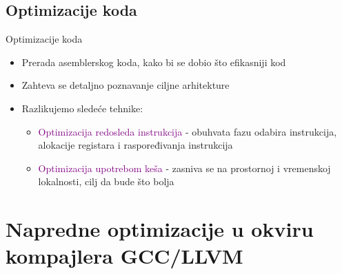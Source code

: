 \documentclass[compress, containsverbatim,mathserif, xcolor=dvipsnames, unicode]{beamer}
\begin{document}
\subsection{Optimizacije koda}
\begin{frame}{Optimizacije koda}
    
    \begin{itemize}
        \item Prerada asemblerskog koda, kako bi se dobio što efikasniji kod
        \item Zahteva se detaljno poznavanje ciljne arhitekture 
        \item Razlikujemo  sledeće tehnike: 
                \begin{itemize}
                    \item \textcolor{purple}{Optimizacija redosleda instrukcija }- obuhvata fazu odabira instrukcija, alokacije registara i raspoređivanja instrukcija
                    \item \textcolor{purple}{Optimizacija upotrebom keša }- zasniva se na prostornoj i vremenskoj lokalnosti, cilj da bude što bolja
                \end{itemize}
        \end{itemize}
\end{frame}

\section{Napredne optimizacije u okviru kompajlera GCC/LLVM}
\end{document}
